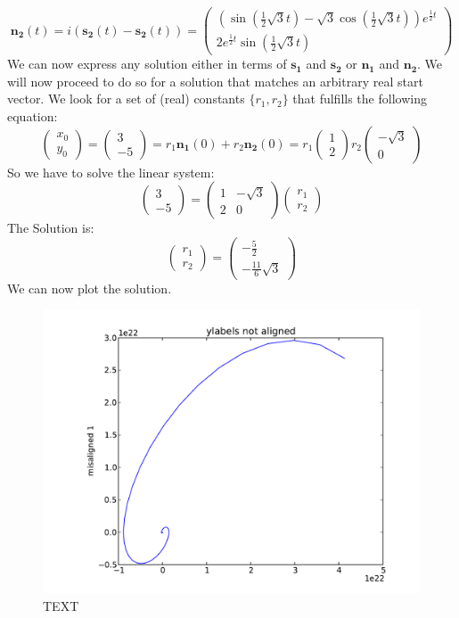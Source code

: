 \documentclass[10pt,a4paper]{article}
\begin{document}
\[
\mathbf{n_2}(t)=i(\mathbf{s_2}(t)-\mathbf{s_2}(t))=\left(\begin{matrix}\left(\sin{\left (\frac{1}{2} \sqrt{3} t \right )} - \sqrt{3} \cos{\left (\frac{1}{2} \sqrt{3} t \right )}\right) e^{\frac{1}{2} t}\\2 e^{\frac{1}{2} t} \sin{\left (\frac{1}{2} \sqrt{3} t \right )}\end{matrix}\right)
\]
We can now express any solution either in terms of $ \mathbf{s_1} $ and $ \mathbf{s_2} $ or $ \mathbf{n_1} $ and $ \mathbf{n_2} $. We will now proceed to do so for a solution that matches an arbitrary real start vector. We look for a set of (real) constants $\{r_1,r_2\} $ that fulfills the following equation:
\[
\left(\begin{matrix}x_{0}\\y_{0}\end{matrix}\right)=\left(\begin{matrix}3\\-5\end{matrix}\right)=r_1 \mathbf{n_1}(0)+ r_2 \mathbf{n_2}(0)=r_1 \left(\begin{matrix}1\\2\end{matrix}\right) r_2 \left(\begin{matrix}- \sqrt{3}\\0\end{matrix}\right)
\]
So we have to solve the linear system:
\[
\left(\begin{matrix}3\\-5\end{matrix}\right)=\left(\begin{matrix}1 & - \sqrt{3}\\2 & 0\end{matrix}\right) \left(\begin{matrix}r_{1}\\r_{2}\end{matrix}\right)
\]
The Solution is: \[ \left(\begin{matrix}r_{1}\\r_{2}\end{matrix}\right)=\left(\begin{matrix}- \frac{5}{2}\\- \frac{11}{6} \sqrt{3}\end{matrix}\right) \]We can now plot the solution.\begin{figure}[t]
\includegraphics[width=12cm]{myfile}
\caption{TEXT}
\end{figure}
\end{document}
